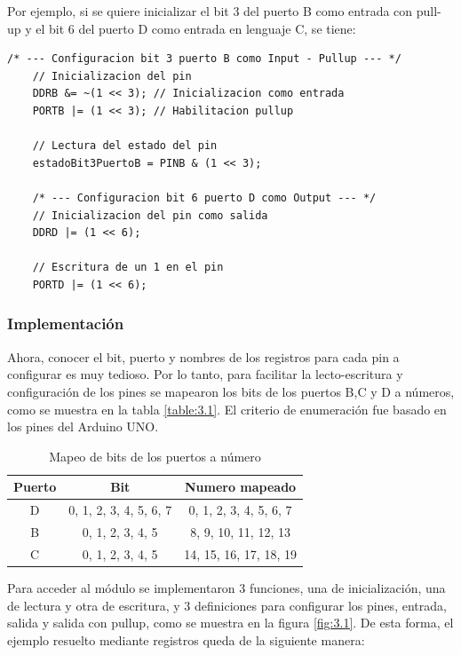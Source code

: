 Por ejemplo, si se quiere inicializar el bit 3 del puerto B como entrada con pull-up y el bit 6 del puerto D como entrada en lenguaje C, se tiene:

\begin{lstlisting}[style=CStyle]
	/* --- Configuracion bit 3 puerto B como Input - Pullup --- */
	// Inicializacion del pin
	DDRB &= ~(1 << 3); // Inicializacion como entrada
	PORTB |= (1 << 3); // Habilitacion pullup
	
	// Lectura del estado del pin
	estadoBit3PuertoB = PINB & (1 << 3);
	
	/* --- Configuracion bit 6 puerto D como Output --- */
	// Inicializacion del pin como salida
	DDRD |= (1 << 6); 
	
	// Escritura de un 1 en el pin
	PORTD |= (1 << 6); 
\end{lstlisting}

\subsubsection{Implementación}

Ahora, conocer el bit, puerto y nombres de los registros para cada pin a configurar es muy tedioso. Por lo tanto, para facilitar la lecto-escritura y configuración de los pines se mapearon los bits de los puertos B,C y D a números, como se muestra en la tabla \ref{table:3.1}. El criterio de enumeración fue basado en los pines del Arduino UNO.

\begin{table}[!ht]
	\begin{center}
		\begin{tabular}{|c|c|c|}
			\hline
			\rowcolor{OODlightblue}
			\textbf{Puerto} & \textbf{Bit} & \textbf{Numero mapeado} \\
			\hline \hline
			D & 0, 1, 2, 3, 4, 5, 6, 7 & 0, 1, 2, 3, 4, 5, 6, 7 \\
			\hline
			B & 0, 1, 2, 3, 4, 5 & 8, 9, 10, 11, 12, 13 \\
			\hline
			C & 0, 1, 2, 3, 4, 5 & 14, 15, 16, 17, 18, 19\\
			\hline
		\end{tabular}
	\end{center}
	\caption{Mapeo de bits de los puertos a número}
	\label{table:\thetable}
\end{table}

Para acceder al módulo se implementaron 3 funciones, una de inicialización, una de  lectura y otra de  escritura, y 3 definiciones para configurar los pines, entrada, salida y salida con pullup, como se muestra en la figura \ref{fig:3.1}. De esta forma, el ejemplo resuelto mediante registros queda de la siguiente manera:

